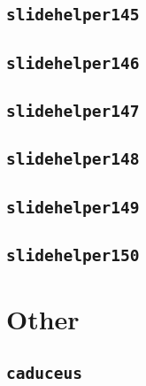 \subsection{\texttt{slidehelper145}}
\newpage
\subsection{\texttt{slidehelper146}}
\newpage
\subsection{\texttt{slidehelper147}}
\newpage
\subsection{\texttt{slidehelper148}}
\newpage
\subsection{\texttt{slidehelper149}}
\newpage
\subsection{\texttt{slidehelper150}}

\newpage

\section{Other}

\subsection{\texttt{caduceus}}


